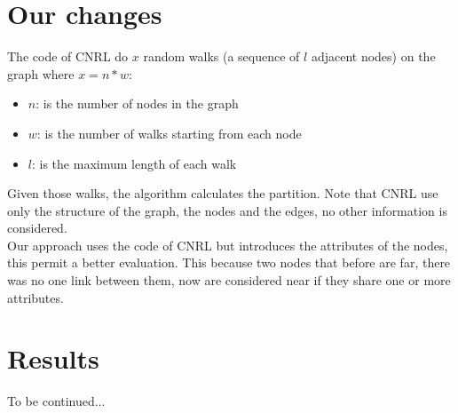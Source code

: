 \section{Our changes}
The code of CNRL do $x$ random walks (a sequence of $l$ adjacent nodes) on the graph where $x=n*w$: 
\begin{itemize}
	\item $n$: is the number of nodes in the graph
	\item $w$: is the number of walks starting from each node
	\item $l$: is the maximum length of each walk
\end{itemize}
Given those walks, the algorithm calculates the partition. Note that CNRL use only the structure of the graph, the nodes and the edges, no other information is considered.\\
Our approach uses the code of CNRL but introduces the attributes of the nodes, this permit a better evaluation. This because two nodes that before are far, there was no one link between them, now are considered near if they share one or more attributes.
%
\section{Results}
To be continued...

%
%
%
%
\newpage
%
